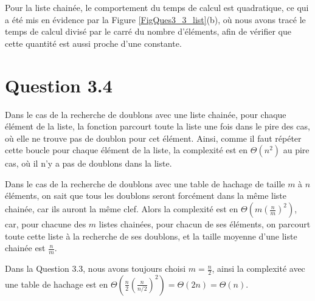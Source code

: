\documentclass[a4paper,12pt]{article}
\numberwithin{equation}{section}
\begin{document}
Pour la liste chainée, le comportement du temps de calcul est quadratique, ce qui a été mis en évidence par la Figure \ref{FigQues3_3_list}(b), où nous avons tracé le temps de calcul divisé par le carré du nombre d'éléments, afin de vérifier que cette quantité est aussi proche d'une constante.

\section*{Question 3.4}

Dans le cas de la recherche de doublons avec une liste chainée, pour chaque élément de la liste, la fonction parcourt toute la liste une fois dans le pire des cas, où elle ne trouve pas de doublon pour cet élément. Ainsi, comme il faut répéter cette boucle pour chaque élément de la liste, la complexité est en $\Theta(n^2)$ au pire cas, où il n'y a pas de doublons dans la liste.

Dans le cas de la recherche de doublons avec une table de hachage de taille $m$ à $n$ éléments, on sait que tous les doublons seront forcément dans la même liste chainée, car ils auront la même clef. Alors la complexité est en $\Theta\left(m \left(\frac{n}{m}\right)^2\right)$, car, pour chacune des $m$ listes chainées, pour chacun de ses éléments, on parcourt toute cette liste à la recherche de ses doublons, et la taille moyenne d'une liste chainée est $\frac{n}{m}$.

Dans la Question 3.3, nous avons toujours choisi $m = \frac{n}{2}$, ainsi la complexité avec une table de hachage est en $\Theta\left(\frac{n}{2}\left(\frac{n}{n/2}\right)^2\right) = \Theta(2n) = \Theta(n)$.
\end{document}
